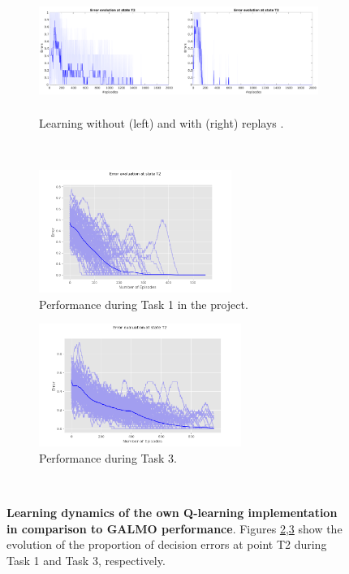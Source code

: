 \documentclass[a4paper]{article}
\begin{document}
	\begin{figure}[t]
		\centering
		\begin{subfigure}{1\textwidth}
			\centering
			\includegraphics[height=4cm]{./figs/QvsDyna2.pdf}
			\caption{Learning without (left) and with (right) replays \citep{NeuralDynaQ}.}
			\label{fig:galmo}
		\end{subfigure}\\
		\begin{subfigure}{.4\textwidth}
			\hspace*{-1cm}
			\includegraphics[height=4cm]{./figs/ErrorTask1.png}
			\caption{Performance during Task 1 in the project.}
			\label{fig:task12}
		\end{subfigure}
		\begin{subfigure}{.4\textwidth}
			\vspace*{-.4cm}
			\includegraphics[height=4cm]{./figs/ErrorTask3.png}
			\caption{Performance during Task 3.}
			\label{fig:task3}
		\end{subfigure}\\
		
		\caption{\textbf{Learning dynamics of the own Q-learning implementation in comparison to GALMO performance}. Figures \ref{fig:task12},\ref{fig:task3} show the evolution of the proportion of decision errors at point T2 during Task 1 and Task 3, respectively.}
		\label{fig:tasks}
	\end{figure}
	\newpage
\end{document}
